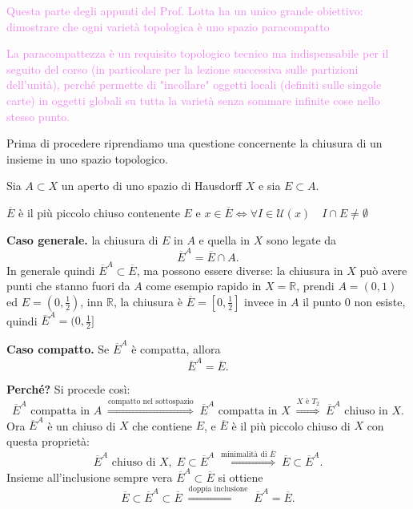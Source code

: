         \textcolor{violet}{Questa parte degli appunti del Prof. Lotta ha un unico grande obiettivo: dimostrare che ogni varietà topologica è uno spazio paracompatto}

        \textcolor{violet}{La paracompattezza è un requisito topologico tecnico ma indispensabile per il seguito del corso 
        (in particolare per la lezione successiva sulle partizioni dell'unità), perché permette di "incollare" oggetti locali (definiti sulle singole carte) in 
        oggetti globali su tutta la varietà senza sommare infinite cose nello stesso punto.}

        Prima di procedere riprendiamo una questione concernente la chiusura di un insieme in uno spazio topologico. 
        \begin{richiamo}
        \label{ric:chiusura_in_aperto_hausdorff}
        \mbox{}

        Sia $A \subset X$ un aperto di uno spazio di Hausdorff $X$ e sia $E \subset A$.
        
        $\overline{E}$ è il più piccolo chiuso contenente $E$ e $x \in \overline{E} \iff \forall I \in \mathcal{U}(x) \quad I \cap E \neq \emptyset$

        \textbf{Caso generale.} la chiusura di $E$ in $A$ e quella in $X$ sono legate da
        \[
        \overline{E}^A = \overline{E} \cap A .
        \]
        In generale quindi $\overline{E}^A \subset \overline{E}$, ma possono essere diverse: la chiusura in $X$ può avere punti che stanno fuori da $A$ 
        come esempio rapido in  $X = \mathbb{R}$, prendi $A = (0, 1)$ ed $E = (0, \tfrac{1}{2})$, inn $\mathbb{R}$, la chiusura è $\overline{E} = [0, \tfrac{1}{2}]$
        invece in $A$ il punto $0$ non esiste, quindi $\overline{E}^A = (0, \tfrac{1}{2}]$

        \textbf{Caso compatto.} Se $\overline{E}^A$ è compatta, allora
        \[
        \overline{E}^A = \overline{E}.
        \]

        \textbf{Perché?} Si procede così:
        \[
        \overline{E}^A \text{ compatta in } A
        \;\overset{\text{compatto nel sottospazio}}{\Longrightarrow}\;
        \overline{E}^A \text{ compatta in } X
        \;\overset{X \text{ è } T_2}{\Longrightarrow}\;
        \overline{E}^A \text{ chiuso in } X.
        \]
        Ora $\overline{E}^A$ è un chiuso di $X$ che contiene $E$, e $\overline{E}$ è il più piccolo chiuso di $X$ con questa proprietà:
        \[
        \overline{E}^A \text{ chiuso di } X,\; E \subset \overline{E}^A
        \;\overset{\text{minimalità di } \overline{E}}{\Longrightarrow}\;
        \overline{E} \subset \overline{E}^A .
        \]
        Insieme all'inclusione sempre vera $\overline{E}^A \subset \overline{E}$ si ottiene
        \[
        \overline{E} \subset \overline{E}^A \subset \overline{E}
        \;\overset{\text{doppia inclusione}}{\Longrightarrow}\;
        \overline{E}^A = \overline{E}.
        \]


\end{richiamo}

